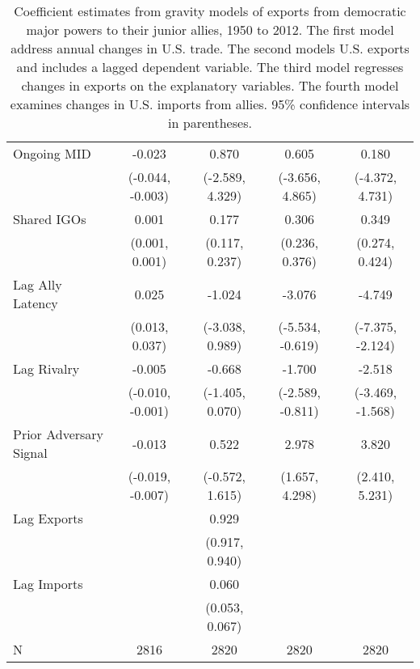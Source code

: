 \begin{table}
{\begin{tabular}[t]{lcccc}
Ongoing MID & -0.023 & 0.870 & 0.605 & 0.180\\
 & (-0.044, -0.003) & (-2.589, 4.329) & (-3.656, 4.865) & (-4.372, 4.731)\\
Shared IGOs & 0.001 & 0.177 & 0.306 & 0.349\\
 & (0.001, 0.001) & (0.117, 0.237) & (0.236, 0.376) & (0.274, 0.424)\\
Lag Ally Latency & 0.025 & -1.024 & -3.076 & -4.749\\
 & (0.013, 0.037) & (-3.038, 0.989) & (-5.534, -0.619) & (-7.375, -2.124)\\
Lag Rivalry & -0.005 & -0.668 & -1.700 & -2.518\\
 & (-0.010, -0.001) & (-1.405, 0.070) & (-2.589, -0.811) & (-3.469, -1.568)\\
Prior Adversary Signal & -0.013 & 0.522 & 2.978 & 3.820\\
 & (-0.019, -0.007) & (-0.572, 1.615) & (1.657, 4.298) & (2.410, 5.231)\\
Lag Exports &  & 0.929 &  & \\
 &  & (0.917, 0.940) &  & \\
Lag Imports &  & 0.060 &  & \\
 &  & (0.053, 0.067) &  & \\
\midrule
N & 2816 & 2820 & 2820 & 2820\\
\bottomrule
\end{tabular}
}
\caption{Coefficient estimates from gravity models of exports from democratic major powers to their junior allies, 1950 to 2012. The first model address annual changes in U.S. trade. The second models U.S. exports and includes a lagged dependent variable. The third model regresses changes in exports on the explanatory variables. The fourth model examines changes in U.S. imports from allies. 95\% confidence intervals in parentheses.}
\label{tab:us-model-coefs}
\end{table}
